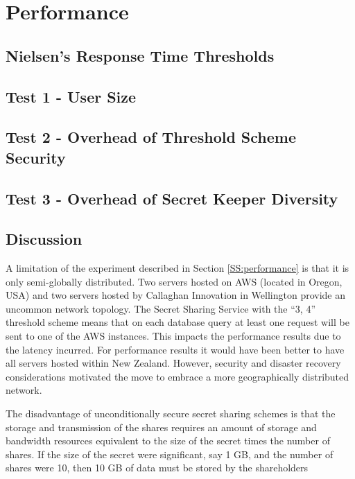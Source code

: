 \section{Performance}

\subsection{Nielsen's Response Time Thresholds}

\subsection{Test 1 - User Size}

\subsection{Test 2 - Overhead of Threshold Scheme Security}

\subsection{Test 3 - Overhead of Secret Keeper Diversity}

\subsection{Discussion}

A limitation of the experiment described in Section \ref{SS:performance} is that it is only semi-globally distributed. Two servers hosted on AWS (located in Oregon, USA) and two servers hosted by Callaghan Innovation in Wellington provide an uncommon network topology. The Secret Sharing Service with the ``3, 4'' threshold scheme means that on each database query at least one request will be sent to one of the AWS instances. This impacts the performance results due to the latency incurred. For performance results it would have been better to have all servers hosted within New Zealand. However, security and disaster recovery considerations motivated the move to embrace a more geographically distributed network.

The disadvantage of unconditionally secure secret sharing schemes is that the storage and transmission of the shares requires an amount of storage and bandwidth resources equivalent to the size of the secret times the number of shares. If the size of the secret were significant, say 1 GB, and the number of shares were 10, then 10 GB of data must be stored by the shareholders
